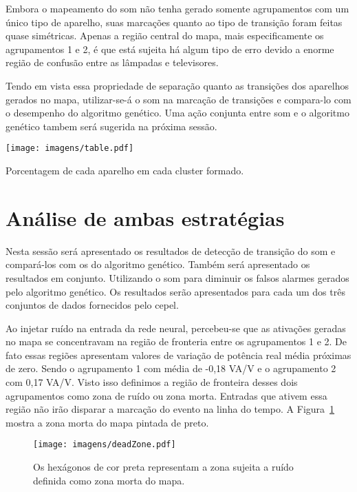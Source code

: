 Embora o mapeamento do \acs{som} não tenha gerado somente agrupamentos
com um único tipo de aparelho, suas marcações quanto ao tipo de
transição foram feitas quase simétricas. Apenas a região central do
mapa, mais especificamente os agrupamentos 1 e 2, é que está sujeita
há algum tipo de erro devido a enorme região de confusão entre as
lâmpadas e televisores.
	
Tendo em vista essa propriedade de separação quanto as transições
dos aparelhos gerados no mapa, utilizar-se-á o \acs{som} na marcação de
transições e compara-lo com o desempenho do algoritmo genético. Uma
ação conjunta entre \acs{som} e o algoritmo genético tambem será sugerida na
próxima sessão. 

\begin{landscape}
\begin{table}[p]
\centering
\texttt{[image: imagens/table.pdf]}
\caption{Porcentagem de cada aparelho em cada cluster formado.}
\label{tab:porc_aparelho}
\end{table}
\end{landscape}

\section{Análise de ambas estratégias}
\label{sec:som_e_es}

Nesta sessão será apresentado os resultados de detecção de transição
do \acs{som} e compará-los com os do algoritmo genético. Também será
apresentado os resultados em conjunto. Utilizando o \acs{som} para diminuir
os falsos alarmes gerados pelo algoritmo genético. Os resultados serão
apresentados para cada um dos três conjuntos de dados fornecidos pelo
\acs{cepel}.
	
Ao injetar ruído na entrada da rede neural, percebeu-se que as
ativações geradas no mapa se concentravam na região de fronteria entre
os agrupamentos 1 e 2. De fato essas regiões apresentam valores de
variação de potência real média próximas de zero. Sendo o agrupamento
1 com média de -0,18 VA/V e o agrupamento 2 com 0,17 VA/V. Visto isso
definimos a região de fronteira desses dois agrupamentos como zona de
ruído ou zona morta. Entradas que ativem essa região não irão disparar
a marcação do evento na linha do tempo. A Figura~\ref{fig:regiao_morta}
mostra a zona morta do mapa pintada de preto.
	
\begin{figure}[!htb]
\centering
\texttt{[image: imagens/deadZone.pdf]}
\caption{Os hexágonos de cor preta representam a zona sujeita a
ruído definida como zona morta do mapa.}
\label{fig:regiao_morta}
\end{figure}

